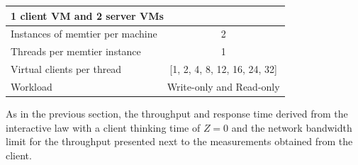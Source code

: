 \documentclass[report.tex]{subfiles}
\begin{document}
\begin{center}
	\scriptsize{
		\begin{tabular}{|l|c|}
			\multicolumn{2}{l}{1 client VM and 2 server VMs}\\
			\hline Instances of memtier per machine & 2                        \\ 
			\hline Threads per memtier instance     & 1                        \\
			\hline Virtual clients per thread       & [1, 2, 4, 8, 12, 16, 24, 32]\\ 
			\hline Workload                         & Write-only and Read-only \\
			\hline 
		\end{tabular}
	} 
\end{center}

As in the previous section, the throughput and response time derived from the interactive law with a client thinking time of $Z=0$ and the network bandwidth limit for the throughput presented next to the measurements obtained from the client.
\end{document}
